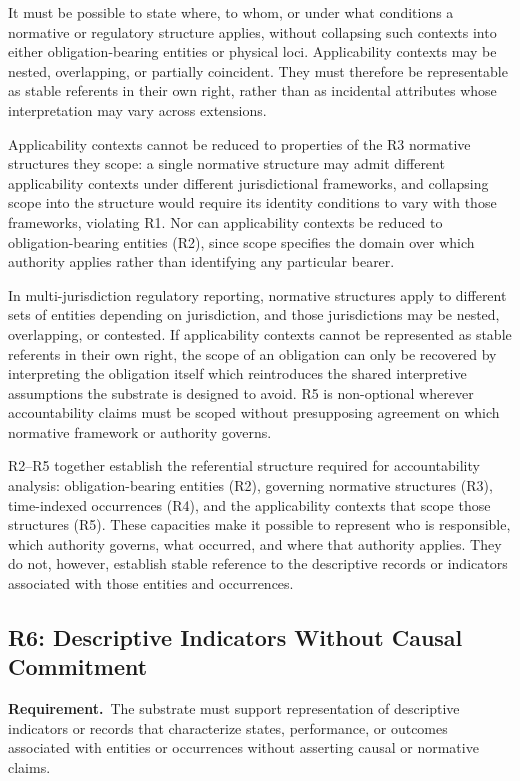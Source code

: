 It must be possible to state where, to whom, or under what conditions a
normative or regulatory structure applies, without collapsing such contexts
into either obligation-bearing entities or physical loci.
Applicability contexts may be nested, overlapping, or partially coincident.
They must therefore be representable as stable referents in their own right,
rather than as incidental attributes whose interpretation may vary across
extensions.

Applicability contexts cannot be reduced to properties of the R3 normative
structures they scope:
a single normative structure may admit different applicability contexts
under different jurisdictional frameworks, and
collapsing scope into the structure would require
its identity conditions to vary with those frameworks, violating R1.
Nor can applicability contexts be reduced to obligation-bearing entities (R2),
since scope specifies the domain over which authority applies rather than
identifying any particular bearer.

In multi-jurisdiction regulatory reporting, normative structures apply
to different sets of entities depending on jurisdiction, and those
jurisdictions may be nested, overlapping, or contested.
If applicability contexts cannot be represented as stable referents in
their own right, the scope of an obligation can only be recovered by
interpreting the obligation itself which reintroduces the shared
interpretive assumptions the substrate is designed to avoid.
R5 is non-optional wherever accountability claims must be scoped without
presupposing agreement on which normative framework or authority governs.

R2--R5 together establish the referential structure required for accountability analysis:
obligation-bearing entities (R2),
governing normative structures (R3),
time-indexed occurrences (R4),
and the applicability contexts that scope those structures (R5).
These capacities make it possible to represent
who is responsible,
which authority governs,
what occurred,
and where that authority applies.
They do not, however, establish stable reference to the descriptive records
or indicators associated with those entities and occurrences.

\subsection{R6: Descriptive Indicators Without Causal Commitment}

\textbf{Requirement.}~The substrate must support representation of descriptive indicators or
records that characterize states, performance, or outcomes associated
with entities or occurrences without asserting causal or normative
claims.

